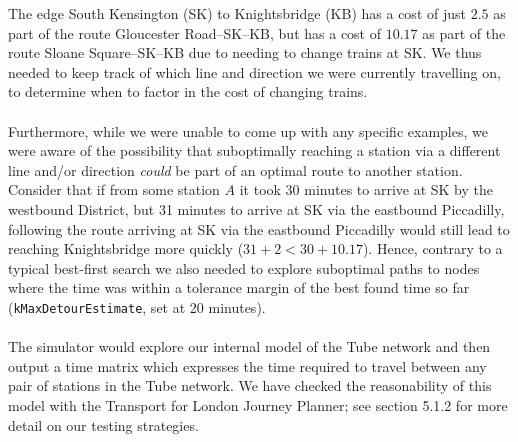 \documentclass[a4paper, 10pt]{report}
\begin{document}
The edge South Kensington (SK) to Knightsbridge (KB) has a cost of just $2.5$ as part of the route Gloucester Road--SK--KB, but has a cost of $10.17$ as part of the route Sloane Square--SK--KB due to needing to change trains at SK. We thus needed to keep track of which line and direction we were currently travelling on, to determine when to factor in the cost of changing trains. \\\\Furthermore, while we were unable to come up with any specific examples, we were aware of the possibility that suboptimally reaching a station via a different line and/or direction \textit{could} be part of an optimal route to another station. Consider that if from some station $A$ it took 30 minutes to arrive at SK by the westbound District, but 31 minutes to arrive at SK via the eastbound Piccadilly, following the route arriving at SK via the eastbound Piccadilly would still lead to reaching Knightsbridge more quickly ($31 + 2 < 30 + 10.17$). Hence, contrary to a typical best-first search we also needed to explore suboptimal paths to nodes where the time was within a tolerance margin of the best found time so far (\texttt{kMaxDetourEstimate}, set at 20 minutes). \\\\
The simulator would explore our internal model of the Tube network and then output a time matrix which expresses the time required to travel between any pair of stations in the Tube network. We have checked the reasonability of this model with the Transport for London Journey Planner; see section 5.1.2 for more detail on our testing strategies.
\end{document}
